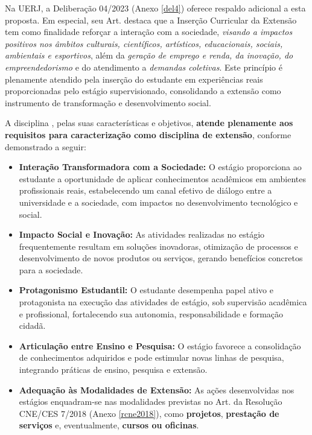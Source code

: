 Na UERJ, a Deliberação  04/2023 (Anexo \ref{del4}) oferece respaldo adicional a esta proposta. Em especial, seu Art.  destaca que a Inserção Curricular da Extensão tem como finalidade reforçar a interação com a sociedade, \textit{visando a impactos positivos nos âmbitos culturais, científicos, artísticos, educacionais, sociais, ambientais e esportivos}, além da \textit{geração de emprego e renda, da inovação, do empreendedorismo} e do atendimento a \textit{demandas coletivas}. Este princípio é plenamente atendido pela inserção do estudante em experiências reais proporcionadas pelo estágio supervisionado, consolidando a extensão como instrumento de transformação e desenvolvimento social.

A disciplina \EstSup, pelas suas características e objetivos, \textbf{atende plenamente aos requisitos para caracterização como disciplina de extensão}, conforme demonstrado a seguir:

\begin{itemize} \item \textbf{Interação Transformadora com a Sociedade:} O estágio proporciona ao estudante a oportunidade de aplicar conhecimentos acadêmicos em ambientes profissionais reais, estabelecendo um canal efetivo de diálogo entre a universidade e a sociedade, com impactos no desenvolvimento tecnológico e social. \item \textbf{Impacto Social e Inovação:} As atividades realizadas no estágio frequentemente resultam em soluções inovadoras, otimização de processos e desenvolvimento de novos produtos ou serviços, gerando benefícios concretos para a sociedade. \item \textbf{Protagonismo Estudantil:} O estudante desempenha papel ativo e protagonista na execução das atividades de estágio, sob supervisão acadêmica e profissional, fortalecendo sua autonomia, responsabilidade e formação cidadã. \item \textbf{Articulação entre Ensino e Pesquisa:} O estágio favorece a consolidação de conhecimentos adquiridos e pode estimular novas linhas de pesquisa, integrando práticas de ensino, pesquisa e extensão. \item \textbf{Adequação às Modalidades de Extensão:} As ações desenvolvidas nos estágios enquadram-se nas modalidades previstas no Art.    da Resolução CNE/CES  7/2018 (Anexo \ref{rcne2018}), como \textbf{projetos}, \textbf{prestação de serviços} e, eventualmente, \textbf{cursos ou oficinas}. \end{itemize}

